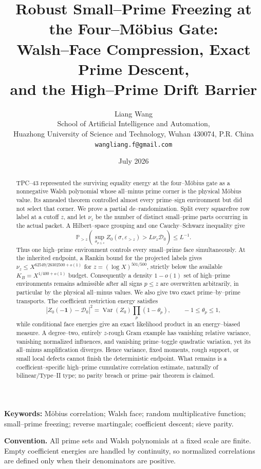 \documentclass[11pt]{article}
\title{\bfseries Robust Small--Prime Freezing at the Four--M\"obius Gate:\\
Walsh--Face Compression, Exact Prime Descent,\\
and the High--Prime Drift Barrier}
\author{Liang Wang\\
\small School of Artificial Intelligence and Automation,\\[-2pt]
\small Huazhong University of Science and Technology, Wuhan 430074, P.R. China\\
\small \texttt{wangliang.f@gmail.com}}
\date{July 2026}
\theoremstyle{definition}
\theoremstyle{remark}
\newcommand{\Pp}{\mathbb P}
\newcommand{\cD}{\mathcal D}
\newcommand{\one}{\mathbf 1}
\begin{document}
\maketitle

\begin{abstract}
TPC--43 represented the surviving equality energy at the four--M\"obius
gate as a nonnegative Walsh polynomial whose all--minus prime corner is
the physical M\"obius value.  Its annealed theorem controlled almost
every prime--sign environment but did not select that corner.  We prove
a partial de--randomization.  Split every squarefree row label at
a cutoff \(z\), and let \(\nu_z\) be the number of distinct small--prime
parts occurring in the actual packet.  A Hilbert--space grouping and one
Cauchy--Schwarz inequality give
\[
 \Pp_{>z}\!\left(
  \sup_{\sigma_{p\le z}}Z_0(\sigma,\varepsilon_{>z})
  >L\nu_z\cD_0\right)\le L^{-1}.
\]
Thus one high--prime environment controls every small--prime face
simultaneously.  At the inherited endpoint, a Rankin bound for the
projected labels gives
\(
 \nu_z\le X^{62549/26302500+o(1)}
\)
for \(z=(\log X)^{501/500}\), strictly below the available
\(K_B=X^{1/400+o(1)}\) budget.  Consequently a density \(1-o(1)\) set of
high--prime environments remains admissible after all signs
\(p\le z\) are overwritten arbitrarily, in particular by the physical
all--minus values.  We also give two exact prime--by--prime transports.
The coefficient restriction energy satisfies
\[
 |Z_0(-\one)-\cD_0|^2
 =\operatorname{Var}(Z_0)
   \prod_p(1-\theta_p),
 \qquad -1\le\theta_p\le1,
\]
while conditional face energies give an exact likelihood product in an
energy--biased measure.  A degree--two, entirely \(z\)-rough Gram
example has vanishing relative variance, vanishing normalized
influences, and vanishing prime--toggle quadratic variation, yet its
all--minus amplification diverges.  Hence variance, fixed moments,
rough support, or small local defects cannot finish the deterministic
endpoint.  What remains is a coefficient--specific high--prime
cumulative correlation estimate, naturally of bilinear/Type--II type;
no parity breach or prime--pair theorem is claimed.
\end{abstract}

\noindent\textbf{Keywords:} M\"obius correlation; Walsh face; random
multiplicative function; small--prime freezing; reverse martingale;
coefficient descent; sieve parity.

\medskip
\noindent\textbf{Convention.}
All prime sets and Walsh polynomials at a fixed scale are finite.  Empty
coefficient energies are handled by continuity, so normalized
correlations are defined only when their denominators are positive.
\end{document}
